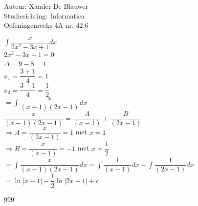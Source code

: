 \documentclass[a4paper]{article}
\begin{document}
\noindent \large Auteur: Xander De Blauwer \\
\noindent \large Studierichting: Informatica\\
\noindent \large Oefeningenreeks 4A nr. 42.6\\

\medskip

\normalsize


$ \displaystyle\int \dfrac{x}{2x^2-3x + 1}dx $ \\

$2x^2-3x + 1 = 0$ \\

$ \Delta = 9 - 8 = 1 $ \\

$ x_1 = \dfrac{3+1}{4} = 1 $ \\

$ x_2 = \dfrac{3-1}{4} = \dfrac{1}{2} $ \\


$ = \displaystyle\int \dfrac{x}{(x-1)(2x-1)}dx $ \\

$ \dfrac{x}{(x-1)(2x-1)} = \dfrac{A}{(x-1)} + \dfrac{B}{(2x-1)}$ \\

$ \Rightarrow A = \dfrac{x}{(2x-1)} = 1 $ met $x = 1$ \\

$ \Rightarrow B = \dfrac{x}{(x-1)} = -1 $ met $x = \dfrac{1}{2}$ \\

$ = \displaystyle\int \dfrac{x}{(x-1)(2x-1)}dx = \displaystyle\int \dfrac{1}{(x-1)}dx - \displaystyle\int \dfrac{1}{(2x-1)}dx $ \\

$ = \ln|x-1| - \dfrac{1}{2}\ln|2x-1| + c $



\begin{thebibliography}{999}
\end{thebibliography}
\end{document}
